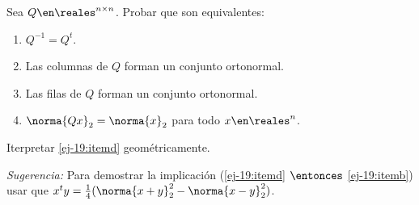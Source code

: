 \begin{enunciado}{\ejercicio}
  Sea $Q \en \reales^{n \times n}$. Probar que son equivalentes:
  \begin{enumerate}[label=(\alph*)]
    \item $Q^{-1} = Q^t$.

    \item\label{ej-19:itemb} Las columnas de $Q$ forman un conjunto ortonormal.

    \item Las filas de $Q$ forman un conjunto ortonormal.

    \item\label{ej-19:itemd} $\norma{Qx}_2 = \norma{x}_2$ para todo $x \en \reales^n$.
  \end{enumerate}
  Iterpretar \ref{ej-19:itemd} geométricamente.

    \textit{Sugerencia:} Para demostrar la implicación
    (\ref{ej-19:itemd} $\entonces$ \ref{ej-19:itemb}) usar que $x^ty = \frac{1}{4}(\norma{x + y}_2^2 - \norma{x - y}_2^2)$.
\end{enunciado}
